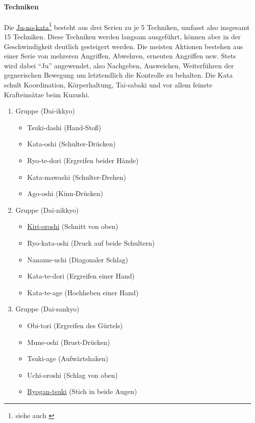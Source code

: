 \documentclass[justified, a4paper, notitlepage, captions=tableheading, nobib]{tufte-handout}
\begin{document}
\paragraph{Techniken}
\label{sec:org0ca1f25}
Die \hyperref[org4191c24]{Ju-no-kata}\footnote{\raggedright siehe auch \citep{kano2007kodokan, djbkataregelwerk}} besteht aus drei Serien zu je 5 Techniken, umfasst also insgesamt 15 Techniken. 
Diese Techniken werden langsam ausgeführt, können aber in der Geschwindigkeit deutlich gesteigert werden. 
Die meisten Aktionen bestehen aus einer Serie von mehreren Angriffen, Abwehren, erneuten Angriffen usw. 
Stets wird dabei "`Ju"' angewendet, also Nachgeben, Ausweichen, Weiterführen der gegnerischen Bewegung um letztendlich die Kontrolle zu behalten. 
Die Kata schult Koordination, Körperhaltung, Tai-sabaki und vor allem feinste Krafteinsätze beim Kuzushi.

\begin{enumerate}
\item Gruppe (Dai-ikkyo)
\begin{itemize}
\item Tsuki-dashi (Hand-Stoß)
\item Kata-oshi (Schulter-Drücken)
\item Ryo-te-dori (Ergreifen beider Hände)
\item Kata-mawashi (Schulter-Drehen)
\item Ago-oshi (Kinn-Drücken)
\end{itemize}
\item Gruppe (Dai-nikkyo)
\begin{itemize}
\item \hyperref[orgf6edc37]{Kiri-oroshi} (Schnitt von oben)
\item Ryo-kata-oshi (Druck auf beide Schultern)
\item Naname-uchi (Diagonaler Schlag)
\item Kata-te-dori (Ergreifen einer Hand)
\item Kata-te-age (Hochheben einer Hand)
\end{itemize}
\item Gruppe (Dai-sankyo)
\begin{itemize}
\item Obi-tori (Ergreifen des Gürtels)
\item Mune-oshi (Brust-Drücken)
\item Tsuki-age (Aufwärtshaken)
\item Uchi-oroshi (Schlag von oben)
\item \hyperref[org7013e1e]{Ryogan-tsuki} (Stich in beide Augen)
\end{itemize}
\end{enumerate}
\end{document}
